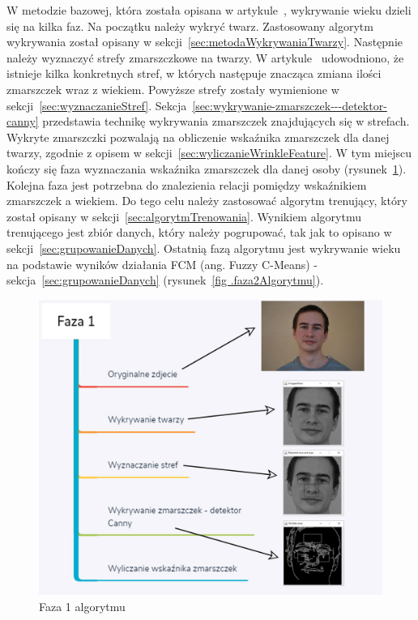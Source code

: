 \documentclass[a4paper,twoside,12pt]{book}
\begin{document}
    W metodzie bazowej, która została opisana w artykule~\cite{wrinkleFeatures}, wykrywanie wieku dzieli się na kilka
    faz.
    Na początku należy wykryć twarz.
    Zastosowany algorytm wykrywania został
    opisany w sekcji~\ref{sec:metodaWykrywaniaTwarzy}.
    Następnie należy wyznaczyć strefy zmarszczkowe na twarzy.
    W artykule~\cite{wrinkleFeatures} udowodniono,
    że istnieje kilka konkretnych stref, w których następuje znacząca zmiana ilości zmarszczek wraz z wiekiem.
    Powyższe strefy zostały wymienione w sekcji~\ref{sec:wyznaczanieStref}.
    Sekcja~\ref{sec:wykrywanie-zmarszczek---detektor-canny} przedstawia technikę
    wykrywania zmarszczek znajdujących się w strefach.
    Wykryte zmarszczki
    pozwalają na obliczenie wskaźnika zmarszczek dla danej twarzy, zgodnie z opisem w sekcji~\ref{sec:wyliczanieWrinkleFeature}.
    W tym miejscu kończy się faza wyznaczania wskaźnika zmarszczek dla danej osoby (rysunek~\ref{fig.faza1Algorytmu}).
    Kolejna faza
    jest potrzebna do
    znalezienia relacji pomiędzy wskaźnikiem zmarszczek a wiekiem.
    Do tego celu należy zastosować algorytm trenujący, który
    został opisany w sekcji~\ref{sec:algorytmTrenowania}.
    Wynikiem algorytmu trenującego jest zbiór danych, który
    należy pogrupować, tak jak to opisano w sekcji~\ref{sec:grupowanieDanych}.
    Ostatnią fazą algorytmu jest wykrywanie wieku
    na podstawie wyników działania FCM (ang. Fuzzy C-Means) - sekcja~\ref{sec:grupowanieDanych}
    (rysunek~\ref{fig .faza2Algorytmu}).

    \begin{figure}[ht!]
        \centering
        \includegraphics[width=12cm]{Obrazy/Faza1.jpg}
        \caption{Faza 1 algorytmu}
        \label{fig.faza1Algorytmu}
    \end{figure}
\end{document}
